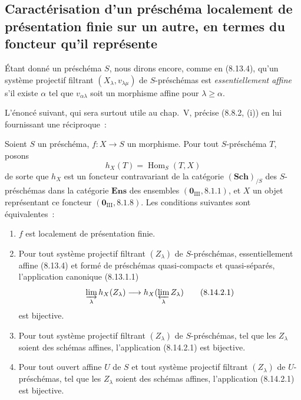 \subsection{Caractérisation d'un préschéma localement de présentation finie sur un autre, en termes du foncteur qu'il représente}
\label{subsection:IV.8.14-fr}

\begin{env}[8.14.1]
\label{IV.8.14.1-fr}
Étant donné un préschéma $S$, nous dirons encore, comme en (8.13.4), qu'un
système projectif filtrant $(X_\lambda,v_{\lambda\mu})$ de $S$-préschémas est
\emph{essentiellement affine} s'il existe $\alpha$ tel que
$v_{\alpha\lambda}$ soit un morphisme affine pour $\lambda\geqslant\alpha$.

L'énoncé suivant, qui sera surtout utile au chap.~V, précise (8.8.2, (i)) en
lui fournissant une réciproque~:
\end{env}

\begin{proposition}[8.14.2]
\label{IV.8.14.2-fr}
Soient $S$ un préschéma, $f:X\to S$ un morphisme. Pour tout $S$-préschéma
$T$, posons
\[
h_X(T)=\operatorname{Hom}_S(T,X)
\]
de sorte que $h_X$ est un foncteur contravariant de la catégorie
$(\mathbf{Sch})_{/S}$ des $S$-préschémas dans la catégorie
$\mathbf{Ens}$ des ensembles $(\mathbf 0_{\mathrm{III}},8.1.1)$, et $X$ un
objet représentant ce foncteur $(\mathbf 0_{\mathrm{III}},8.1.8)$. Les
conditions suivantes sont équivalentes~:
\begin{enumerate}[label=\emph{\alph*)}]
  \item $f$ est localement de présentation finie.
  \item Pour tout système projectif filtrant $(Z_\lambda)$ de
  $S$-préschémas, essentiellement affine (8.13.4) et formé de préschémas
  quasi-compacts et quasi-séparés, l'application canonique (8.13.1.1)
\begin{equation}
\label{IV.8.14.2.1-fr}
\varinjlim_\lambda h_X(Z_\lambda)
\longrightarrow h_X(\varprojlim_\lambda Z_\lambda) \tag{8.14.2.1}
\end{equation}
  est bijective.
  \item Pour tout système projectif filtrant $(Z_\lambda)$ de
  $S$-préschémas, tel que les $Z_\lambda$ soient des schémas affines,
  l'application (8.14.2.1) est bijective.
  \item[\rm c$'$)] Pour tout ouvert affine $U$ de $S$ et tout système
  projectif filtrant $(Z_\lambda)$ de $U$-préschémas, tel que les $Z_\lambda$
  soient des schémas affines, l'application (8.14.2.1) est bijective.
\end{enumerate}
\end{proposition}

